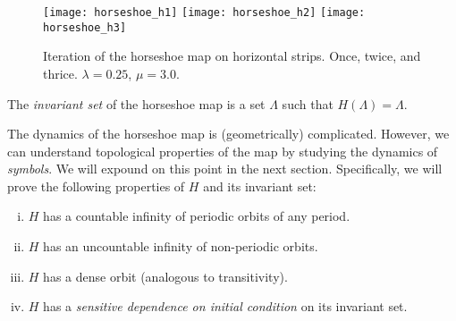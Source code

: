 \begin{figure}[ht]
  \centering
    \texttt{[image: horseshoe\_h1]}
    \hspace{2mm}
    \texttt{[image: horseshoe\_h2]}
    \hspace{2mm}
    \texttt{[image: horseshoe\_h3]}
  \caption{
    Iteration of the horseshoe map on horizontal strips. Once, twice, and thrice.
    $\lambda = 0.25$, $\mu = 3.0$.
  }
  \label{fig:horseshoe-horizontal}
\end{figure}

The \textit{invariant set} of the horseshoe map is a set $\Lambda$ such that $H(\Lambda) = \Lambda$.

The dynamics of the horseshoe map is (geometrically) complicated.
However, we can understand topological properties of the map by studying the dynamics of \textit{symbols}.
We will expound on this point in the next section.
Specifically, we will prove the following properties of $H$ and its invariant set:
\begin{enumerate}[(i)]
  \item $H$ has a countable infinity of periodic orbits of any period.
  \item $H$ has an uncountable infinity of non-periodic orbits.
  \item $H$ has a dense orbit (analogous to transitivity).
  \item $H$ has a \textit{sensitive dependence on initial condition} on its invariant set.
\end{enumerate}

